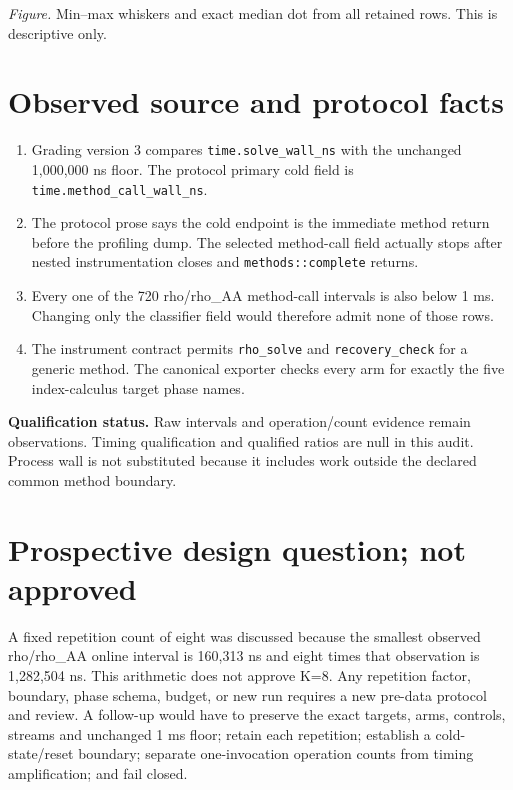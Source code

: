\documentclass[10pt]{article}
\begin{document}
\begin{center}
\end{center}
\textit{Figure.} Min--max whiskers and exact median dot from all retained rows. This is descriptive only.
\section*{Observed source and protocol facts}
\begin{enumerate}
\item Grading version 3 compares \texttt{time.solve\_wall\_ns} with the unchanged 1,000,000 ns floor. The protocol primary cold field is \texttt{time.method\_call\_wall\_ns}.
\item The protocol prose says the cold endpoint is the immediate method return before the profiling dump. The selected method-call field actually stops after nested instrumentation closes and \texttt{methods::complete} returns.
\item Every one of the 720 rho/rho\_AA method-call intervals is also below 1 ms. Changing only the classifier field would therefore admit none of those rows.
\item The instrument contract permits \texttt{rho\_solve} and \texttt{recovery\_check} for a generic method. The canonical exporter checks every arm for exactly the five index-calculus target phase names.
\end{enumerate}
\textbf{Qualification status.} Raw intervals and operation/count evidence remain observations. Timing qualification and qualified ratios are null in this audit. Process wall is not substituted because it includes work outside the declared common method boundary.
\section*{Prospective design question; not approved}
A fixed repetition count of eight was discussed because the smallest observed rho/rho\_AA online interval is 160,313 ns and eight times that observation is 1,282,504 ns. This arithmetic does not approve K=8. Any repetition factor, boundary, phase schema, budget, or new run requires a new pre-data protocol and review. A follow-up would have to preserve the exact targets, arms, controls, streams and unchanged 1 ms floor; retain each repetition; establish a cold-state/reset boundary; separate one-invocation operation counts from timing amplification; and fail closed.
\end{document}
